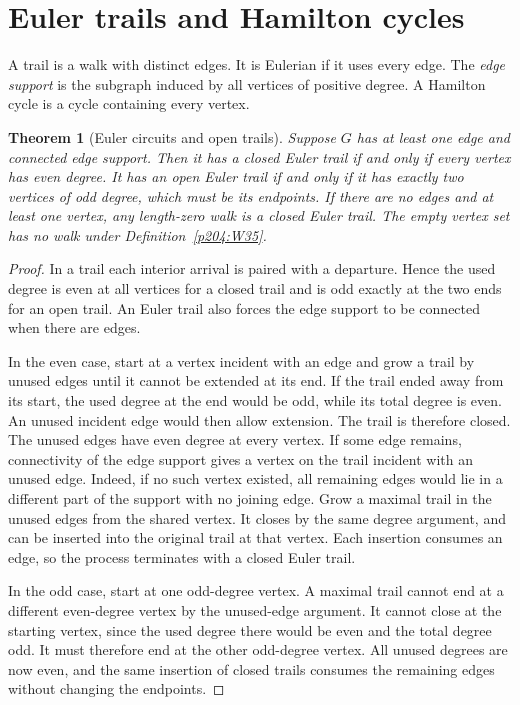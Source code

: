 \documentclass[11pt,oneside,openany]{book}
\theoremstyle{plain}
\newtheorem{theorem}{Theorem}[chapter]
\theoremstyle{definition}
\theoremstyle{remark}
\begin{document}
\section{Euler trails and Hamilton cycles}

A trail is a walk with distinct edges. It is Eulerian if it uses every
edge. The \emph{edge support} is the subgraph induced by all vertices
of positive degree. A Hamilton cycle is a cycle containing every vertex.

\begin{theorem}[Euler circuits and open trails]\label{p204:W39}
Suppose \(G\) has at least one edge and connected edge support. Then
it has a closed Euler trail if and only if every vertex has even degree.
It has an open Euler trail if and only if it has exactly two vertices
of odd degree, which must be its endpoints. If there are no edges and
at least one vertex, any length-zero walk is a closed Euler trail.
The empty vertex set has no walk under Definition~\ref{p204:W35}.
\end{theorem}

\begin{proof}
In a trail each interior arrival is paired with a departure. Hence the
used degree is even at all vertices for a closed trail and is odd
exactly at the two ends for an open trail. An Euler trail also forces
the edge support to be connected when there are edges.

In the even case, start at a vertex incident with an edge and grow a
trail by unused edges until it cannot be extended at its end. If the
trail ended away from its start, the used degree at the end would be
odd, while its total degree is even. An unused incident edge would
then allow extension. The trail is therefore closed. The unused edges
have even degree at every vertex. If some edge remains, connectivity
of the edge support gives a vertex on the trail incident with an
unused edge. Indeed, if no such vertex existed, all remaining edges
would lie in a different part of the support with no joining edge.
Grow a maximal trail in the unused edges from the shared vertex.
It closes by the same degree argument, and can be inserted into the
original trail at that vertex. Each insertion consumes an edge, so
the process terminates with a closed Euler trail.

In the odd case, start at one odd-degree vertex. A maximal trail
cannot end at a different even-degree vertex by the unused-edge
argument. It cannot close at the starting vertex, since the used degree
there would be even and the total degree odd. It must therefore end at
the other odd-degree vertex. All unused degrees are now even, and the
same insertion of closed trails consumes the remaining edges without
changing the endpoints.
\end{proof}
\end{document}
